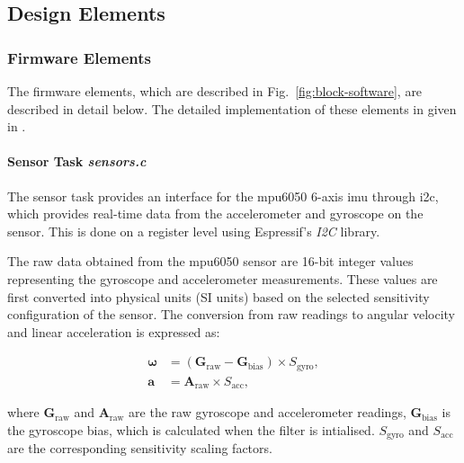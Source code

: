 
\subsection{Design Elements}
\label{sec:design-elements}



\subsubsection{Firmware Elements}

The firmware elements, which are described in Fig.~\ref{fig:block-software}, are described in detail below. The detailed implementation of these elements in given in \cite{flightcontroller_git}.

\paragraph{\textbf{Sensor Task} \textit{sensors.c}} \leavevmode

The sensor task provides an interface for the \gls{mpu6050} 6-axis \gls{imu} through \gls{i2c}, which provides real-time data from the accelerometer and gyroscope on the sensor. This is done on a register level using Espressif's \textit{I2C} library.

The raw data obtained from the \gls{mpu6050} sensor are 16-bit integer values representing the gyroscope and accelerometer measurements. These values are first converted into physical units (SI units) based on the selected sensitivity configuration of the sensor. The conversion from raw readings to angular velocity and linear acceleration is expressed as:

\begin{align}
\boldsymbol{\omega} &= (\mathbf{G}_{\text{raw}} - \mathbf{G}_{\text{bias}}) \times S_{\text{gyro}}, \\[6pt]
\mathbf{a} &= \mathbf{A}_{\text{raw}} \times S_{\text{acc}},
\end{align}

where \( \mathbf{G}_{\text{raw}} \) and \( \mathbf{A}_{\text{raw}} \) are the raw gyroscope and accelerometer readings, 
\( \mathbf{G}_{\text{bias}} \) is the gyroscope bias, which is calculated when the filter is intialised. \( S_{\text{gyro}} \) and \( S_{\text{acc}} \) are the corresponding sensitivity scaling factors.

